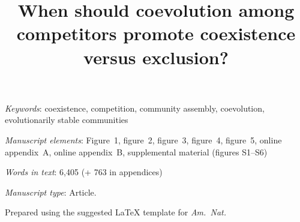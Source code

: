 \documentclass[11pt]{article}
\title{When should coevolution among competitors promote coexistence versus exclusion?}
\author{}
\date{}
\begin{document}
\raggedright


\maketitle

%
%

\bigskip

{
\parindent0pt

\textit{Keywords}: {
coexistence,
competition,
community assembly,
coevolution,
evolutionarily stable communities}


\bigskip


\textit{Manuscript elements}: Figure~1, figure~2, figure~3, figure~4, figure~5,
online appendix~A, online appendix~B,
supplemental material  (figures S1--S6)

\bigskip

\textit{Words in text}: 6,405 (+ 763 in appendices)

\bigskip

\textit{Manuscript type}: Article.


\bigskip

\footnotesize Prepared using the suggested \LaTeX{} template for \textit{Am.\ Nat.}
}

\linenumbers{}
\modulolinenumbers[3]

\newpage{}
\setlength{\parindent}{20pt}












\newpage{}



\end{document}
